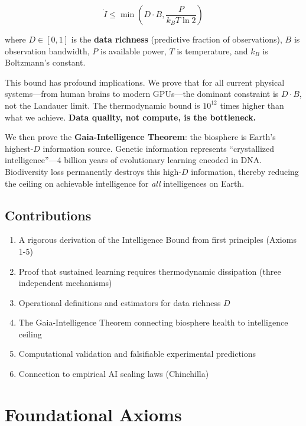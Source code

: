 \documentclass{article}
\begin{document}
\begin{equation}
\boxed{\dot{I} \leq \min\left(D \cdot B, \frac{P}{k_B T \ln 2}\right)}
\end{equation}

where $D \in [0,1]$ is the \textbf{data richness} (predictive fraction of observations), $B$ is observation bandwidth, $P$ is available power, $T$ is temperature, and $k_B$ is Boltzmann's constant.

This bound has profound implications. We prove that for all current physical systems---from human brains to modern GPUs---the dominant constraint is $D \cdot B$, not the Landauer limit. The thermodynamic bound is $10^{12}$ times higher than what we achieve. \textbf{Data quality, not compute, is the bottleneck.}

We then prove the \textbf{Gaia-Intelligence Theorem}: the biosphere is Earth's highest-$D$ information source. Genetic information represents ``crystallized intelligence''---4 billion years of evolutionary learning encoded in DNA. Biodiversity loss permanently destroys this high-$D$ information, thereby reducing the ceiling on achievable intelligence for \textit{all} intelligences on Earth.

\subsection{Contributions}

\begin{enumerate}
    \item A rigorous derivation of the Intelligence Bound from first principles (Axioms 1-5)
    \item Proof that sustained learning requires thermodynamic dissipation (three independent mechanisms)
    \item Operational definitions and estimators for data richness $D$
    \item The Gaia-Intelligence Theorem connecting biosphere health to intelligence ceiling
    \item Computational validation and falsifiable experimental predictions
    \item Connection to empirical AI scaling laws (Chinchilla)
\end{enumerate}

\section{Foundational Axioms}
\end{document}
